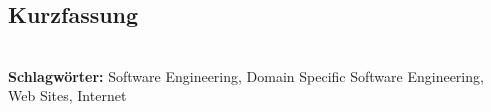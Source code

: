 
\subsection*{Kurzfassung}



%
\mbox{}\\[0.5\baselineskip]\noindent
\textbf{Schlagwörter:} 
Software Engineering, Domain Specific Software Engineering, Web Sites, Internet







 
 






